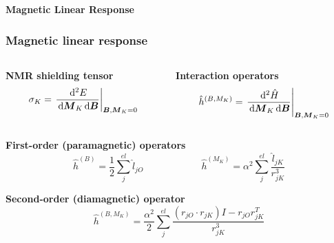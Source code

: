 \begin{frame}
    \centering
    \textbf{\Large{Magnetic Linear Response}}
\end{frame}

\begin{frame}
\frametitle{Magnetic linear response}

\begin{columns}
\begin{column}[b]{0.48\linewidth}
    \centering
    \textbf{NMR shielding tensor}
    \begin{equation}
        \nonumber
        \sigma_K = \left. \frac{\,\mathrm{d}^2 E}{\,\mathrm{d} \boldsymbol{M}_K \,\mathrm{d}
        \boldsymbol{B}}\right|_{\boldsymbol{B},\boldsymbol{M}_K=0}
    \end{equation}
\end{column}

\begin{column}[b]{0.48\linewidth}
    \centering
    \textbf{Interaction operators}
    \begin{equation}
        \nonumber
        \hat{h}^{(B,M_K)} = 
        \left. \frac{\,\mathrm{d}^2 \hat{H}}{\,\mathrm{d} \boldsymbol{M}_K \,\mathrm{d}
        \boldsymbol{B}}\right|_{\boldsymbol{B},\boldsymbol{M}_K=0}
    \end{equation}
\end{column}

\end{columns}

\vspace{10mm}
\centering

\pause
\textbf{First-order (paramagnetic) operators}
\begin{equation}
    \nonumber
    \hat{h}^{(B)} = \frac{1}{2}\sum_j^{el} \hat{l}_{jO} \qquad \qquad \qquad
    \hat{h}^{(M_K)} = \alpha^2 \sum_j^{el} \frac{\hat{l}_{jK}}{r_{jK}^3}
\end{equation}

\vspace{5mm}

\pause
\textbf{Second-order (diamagnetic) operator}
\begin{equation}
    \nonumber
    \hat{h}^{(B,M_K)} = \frac{\alpha^2}{2} 
    \sum_j^{el} \frac{\left(r_{jO}\cdot r_{jK}\right)I -
    r_{jO}r_{jK}^T}{r_{jK}^3}
\end{equation}

\end{frame}

